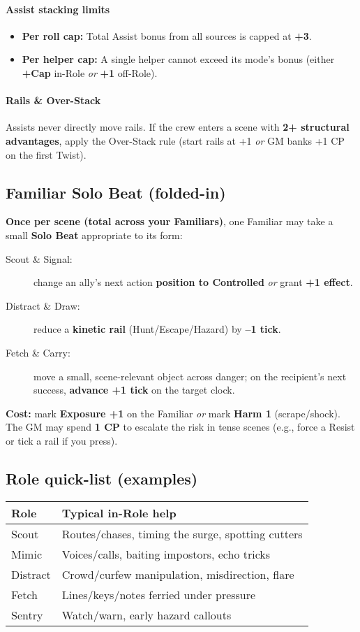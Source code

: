 \documentclass[12pt]{article}
\begin{document}
\paragraph{Assist stacking limits}
\begin{itemize}
  \item \textbf{Per roll cap:} Total Assist bonus from all sources is capped at \textbf{+3}.
  \item \textbf{Per helper cap:} A single helper cannot exceed its mode’s bonus (either \textbf{+Cap} in-Role \emph{or} \textbf{+1} off-Role).
\end{itemize}

\paragraph{Rails \& Over-Stack}
Assists never directly move rails. If the crew enters a scene with \textbf{2+ structural advantages}, apply the Over-Stack rule (start rails at +1 \emph{or} GM banks +1 CP on the first \spadesuit{} Twist).

\subsection*{Familiar Solo Beat (folded-in)}
\textbf{Once per scene (total across your Familiars)}, one Familiar may take a small \textbf{Solo Beat} appropriate to its form:

\begin{description}
  \item[Scout \& Signal:] change an ally’s next action \textbf{position to Controlled} \emph{or} grant \textbf{+1 effect}.
  \item[Distract \& Draw:] reduce a \textbf{kinetic rail} (Hunt/Escape/Hazard) by \textbf{--1 tick}.
  \item[Fetch \& Carry:] move a small, scene-relevant object across danger; on the recipient’s next success, \textbf{advance +1 tick} on the target clock.
\end{description}

\noindent \textbf{Cost:} mark \textbf{Exposure +1} on the Familiar \emph{or} mark \textbf{Harm 1} (scrape/shock). The GM may spend \textbf{1 CP} to escalate the risk in tense scenes (e.g., force a Resist or tick a rail if you press).

\subsection*{Role quick-list (examples)}
\begin{tabular}{@{}l l@{}}
\toprule
\textbf{Role} & \textbf{Typical in-Role help} \\
\midrule
Scout & Routes/chases, timing the surge, spotting cutters \\
Mimic & Voices/calls, baiting impostors, echo tricks \\
Distract & Crowd/curfew manipulation, misdirection, flare \\
Fetch & Lines/keys/notes ferried under pressure \\
Sentry & Watch/warn, early hazard callouts \\
\bottomrule
\end{tabular}
\end{document}
